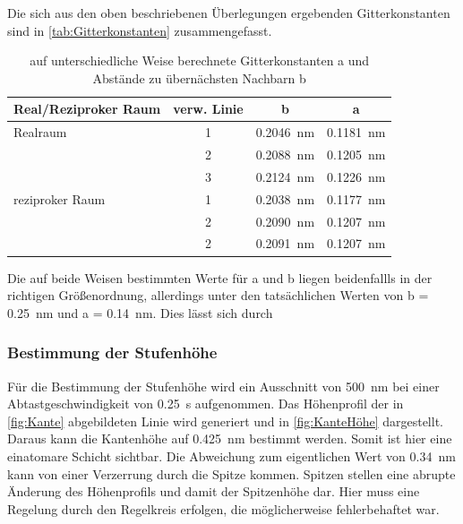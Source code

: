\documentclass[a4paper,twoside,final]{article}
\begin{document}
Die sich aus den oben beschriebenen Überlegungen ergebenden Gitterkonstanten sind in \ref{tab:Gitterkonstanten} zusammengefasst.

\begin{table}[H]
	\centering
	\caption{auf unterschiedliche Weise berechnete Gitterkonstanten a und Abstände zu übernächsten Nachbarn b}
	\label{tab:Gitterkonstante}
  \begin{tabular}{l c c c}
   \toprule
   Real/Reziproker Raum & verw. Linie & b  & a  \\
   \midrule
   Realraum    & 1  & \SI{0,2046}{\nano\meter}  & \SI{0,1181}{\nano\meter}\\
     & 2 & \SI{0,2088}{\nano\meter}         & \SI{0,1205}{\nano\meter}\\
   & 3 & \SI{0,2124}{\nano\meter}         & \SI{0,1226}{\nano\meter}\\
  reziproker Raum  & 1 & \SI{0,2038}{\nano\meter}         & \SI{0,1177}{\nano\meter}\\
   & 2 & \SI{0,2090}{\nano\meter}         & \SI{0,1207}{\nano\meter}\\
    & 2 & \SI{0,2091}{\nano\meter}         & \SI{0,1207}{\nano\meter}\\
   \bottomrule
  \end{tabular}
\end{table}

Die auf beide Weisen bestimmten Werte für a und b liegen beidenfallls in der richtigen Größenordnung, allerdings unter den tatsächlichen Werten von b = \SI{0,25}{\nano\meter} und a = \SI{0,14}{\nano\meter}. Dies lässt sich durch


\subsubsection{Bestimmung der Stufenhöhe}
Für die Bestimmung der Stufenhöhe wird ein Ausschnitt von \SI{500}{\nano\meter} bei einer Abtastgeschwindigkeit von \SI{0,25}{\second} aufgenommen. Das Höhenprofil der in \ref{fig:Kante} abgebildeten Linie wird generiert und in \ref{fig:KanteHöhe} dargestellt. Daraus kann die Kantenhöhe auf \SI{0,425}{\nano\meter} bestimmt werden. Somit ist hier eine einatomare Schicht sichtbar. Die Abweichung zum eigentlichen Wert von \SI{0,34}{\nano\meter} kann von einer Verzerrung durch die Spitze kommen. Spitzen stellen eine abrupte Änderung des Höhenprofils und damit der Spitzenhöhe dar. Hier muss eine Regelung durch den Regelkreis erfolgen, die möglicherweise fehlerbehaftet war.
\end{document}

